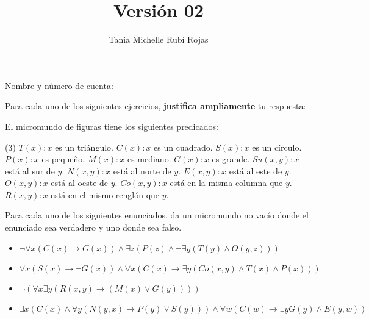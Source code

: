 \documentclass[oneside]{style}
\title{Versión 02}
\author{Tania Michelle Rubí Rojas}
\begin{document}
\maketitle

\vspace{5mm}
\noindent
Nombre y número de cuenta: \hrulefill\

\vspace*{5mm}
Para cada uno de los siguientes ejercicios, \textbf{justifica ampliamente} tu 
respuesta:

\begin{questions}[label=\protect\circled{\bfseries\arabic*}]

    \question
    {
        El micromundo de figuras tiene los siguientes predicados:
        \begin{tasks}(3)
            \task $T(x): x$ es un triángulo. 
            \task $C(x): x$ es un cuadrado.
            \task $S(x): x$ es un círculo.
            \task $P(x): x$ es pequeño.
            \task $M(x): x$ es mediano.
            \task $G(x): x$ es grande. 
            \task $Su(x,y): x$ está al sur de $y$.
            \task $N(x,y): x$ está al norte de $y$.
            \task $E(x,y): x$ está al este de $y$.
            \task $O(x,y): x$ está al oeste de $y$.
            \task $Co(x,y): x$ está en la misma columna que $y$.
            \task $R(x,y): x$ está en el mismo renglón que $y$.
        \end{tasks}

        Para cada uno de los siguientes enunciados, da un 
        micromundo no vacío donde el enunciado sea verdadero y 
        uno donde sea falso. 
        \begin{itemize}
            \item $\neg \forall x (C(x) \rightarrow G(x)) \land \exists 
            z (P(z) \land \neg \exists y (T(y) \land O(y,z)))$

            \item $\forall x (S(x) \rightarrow \neg G(x)) \land 
            \forall x (C(x) \rightarrow \exists y (Co(x,y) \land 
            T(x) \land P(x)))$

            \item $\neg (\forall x \exists y (R(x,y) \rightarrow 
            (M(x) \lor G(y))))$

            \item $\exists x (C(x) \land \forall y (N(y,x) \rightarrow 
            P(y) \lor S(y))) \land \forall w (C(w) \rightarrow \exists 
            y G(y) \land E(y,w))$
        \end{itemize}
    }    
    

\end{questions}
\end{document}
